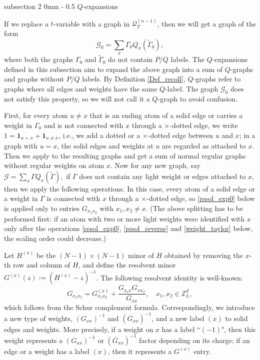 \documentclass{article}
\makeatletter
\newcommand{\1}{\mathds{1}}
\numberwithin{equation}{section}
\newcommand{\be}{\begin{equation}}
\newcommand{\ee}{\end{equation}}
\renewcommand{\cal}{\mathcal}
\newcommand{\wt}{\widetilde}
\newcommand{\Z}{\mathbb{Z}}
\theoremstyle{plain} %
\theoremstyle{remark}
\newcommand{\QT}{\mathcal Q_T}
\renewcommand{\subsection}{\@startsection
	{subsection}%
	{2}%
	{0mm}%
	{-\baselineskip}%
	{0.5\baselineskip}%
	{\normalfont\bf\itshape}} %
\makeatother
\begin{document}
\subsection{$Q$-expansions}\label{sec defnQ}

If we replace a $t$-variable with a graph in $\QT^{(n-1)}$, then we will get a graph of the form  
\be\label{QG}\cal G_0=\sum_x \Gamma_0 Q_x (\wt\Gamma_0) ,\ee
where both the graphs $\Gamma_0$ and $\wt\Gamma_0$ do not contain $P/Q$ labels. The $Q$-expansions defined  in this subsection aim to expand the above graph into a sum of $Q$-graphs and graphs without $P/Q$ labels.  By Definition \ref{Def_recoll}, $Q$-graphs refer to graphs where all edges and weights have the same $Q$-label. The graph $\cal G_0$ does not satisfy this property, so we will not call it a $Q$-graph to avoid confusion. 

\medskip
{} First, for every atom $u\ne x$ that is an ending atom of a solid edge or carries a weight in $\Gamma_0$ and is not connected with $x$ through a $\times$-dotted edge, we write $1=\mathbf 1_{u=x}+\mathbf 1_{u\ne x}$, i.e., we add a dotted or a $\times$-dotted edge between $u$ and $x$; in a graph with $u=x$, the solid edges and weights at $u$ are regarded as attached to $x$. Then we apply \smash{${\cal O}^{(x),1}_{weight} \circ\cal O_{dot}$} to the resulting graphs and get a sum of normal regular graphs without regular weights on atom $x$. Now for any new graph, say $\cal G=\sum_x \Gamma Q_x (\wt \Gamma), $ if $\Gamma$ does not contain any light weight or edges attached to $x$, then we apply the following operations. In this case, every atom of a solid edge or a weight in $\Gamma$ is connected with $x$ through a $\times$-dotted edge, so \eqref{resol_exp0} below is applied only to entries $G_{x_1x_2}$ with $x_1,x_2\ne x$. (The above splitting has to be performed first: if an atom with two or more light weights were identified with $x$ only after the operations \eqref{resol_exp0}, \eqref{resol_reverse} and \eqref{weight_taylor} below, the scaling order could decrease.)


Let $H^{(x)}$ be the $(N-1)\times(N-1)$ minor of $H$ obtained by removing the $x$-th row and column of $H$, and define the resolvent minor $G^{(x)}(z):=(H^{(x)}-z)^{-1}$. The following resolvent identity is well-known:
\be\label{resol_exp0}G_{x_1x_2}=G_{x_1x_2}^{(x)}+\frac{G_{x_1 x}G_{xx_2}}{G_{xx}},\quad x_1,x_2\in \Z_L^d,\ee
which follows from the Schur complement formula. Correspondingly, we introduce a new type of weights, $(G_{xx})^{-1}$ and $(\overline G_{xx})^{-1}$, and a new label $(x)$ to solid edges and weights. More precisely, if a weight on $x$ has a label ``$(-1)$", then this weight represents a $(G_{xx})^{-1}$ or $(\overline G_{xx})^{-1}$ factor depending on its charge; if an edge or a weight has a label $(x)$, then it represents a $G^{(x)}$ entry. 
\end{document}
